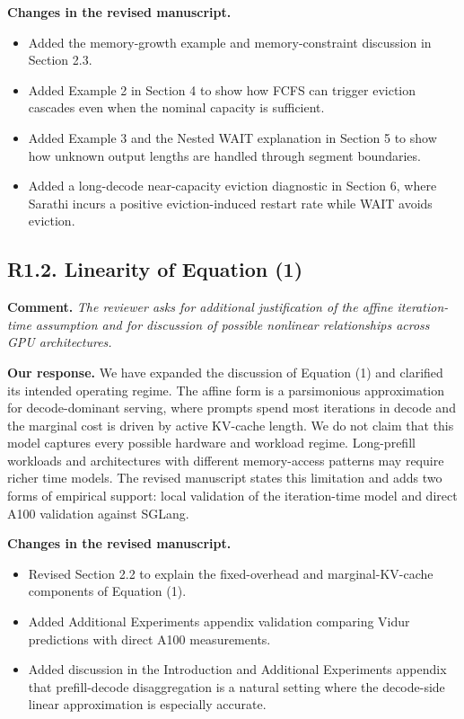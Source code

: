 \documentclass[11pt]{article}
\newcommand{\comment}[1]{%
  \vspace{0.25em}
  \noindent\textbf{Comment.} \emph{#1}
}
\newcommand{\response}{\vspace{0.25em}\noindent\textbf{Our response.} }
\newcommand{\changes}{\vspace{0.25em}\noindent\textbf{Changes in the revised manuscript.} }
\begin{document}
\changes
\begin{itemize}
    \item Added the memory-growth example and memory-constraint discussion in Section 2.3.
    \item Added Example 2 in Section 4 to show how FCFS can trigger eviction cascades even when the nominal capacity is sufficient.
    \item Added Example 3 and the Nested WAIT explanation in Section 5 to show how unknown output lengths are handled through segment boundaries.
    \item Added a long-decode near-capacity eviction diagnostic in Section 6, where Sarathi incurs a positive eviction-induced restart rate while WAIT avoids eviction.
\end{itemize}

\subsection*{R1.2. Linearity of Equation (1)}

\comment{The reviewer asks for additional justification of the affine iteration-time assumption and for discussion of possible nonlinear relationships across GPU architectures.}

\response We have expanded the discussion of Equation (1) and clarified its intended operating regime. The affine form is a parsimonious approximation for decode-dominant serving, where prompts spend most iterations in decode and the marginal cost is driven by active KV-cache length. We do not claim that this model captures every possible hardware and workload regime. Long-prefill workloads and architectures with different memory-access patterns may require richer time models. The revised manuscript states this limitation and adds two forms of empirical support: local validation of the iteration-time model and direct A100 validation against SGLang.

\changes
\begin{itemize}
    \item Revised Section 2.2 to explain the fixed-overhead and marginal-KV-cache components of Equation (1).
    \item Added Additional Experiments appendix validation comparing Vidur predictions with direct A100 measurements.
    \item Added discussion in the Introduction and Additional Experiments appendix that prefill-decode disaggregation is a natural setting where the decode-side linear approximation is especially accurate.
\end{itemize}
\end{document}
